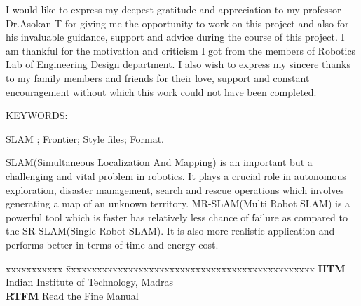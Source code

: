 \documentclass[MTech]{iitmdiss}
\begin{document}
\acknowledgements

I would like to express my deepest gratitude and appreciation to my professor Dr.Asokan T for giving me the opportunity to work on this project and also for his invaluable guidance, support and advice during the course of this project. I am thankful for the motivation and criticism I got from the members of Robotics Lab of Engineering Design department. I also wish to express my sincere thanks to my family members and friends for their love, support and constant encouragement without which this work could not have been completed. 


\abstract

\noindent KEYWORDS: \hspace*{0.5em} \parbox[t]{4.4in}{SLAM ; Frontier;
  Style files; Format.}

\vspace*{24pt}

\noindent SLAM(Simultaneous Localization And Mapping) is an important but a challenging and vital problem in robotics. It plays a crucial role in autonomous exploration, disaster management, search and rescue operations which involves generating a map of an unknown territory. MR-SLAM(Multi Robot SLAM) is a powerful tool which is faster has relatively less chance of failure as compared to the SR-SLAM(Single Robot SLAM). It is also more realistic application and performs better in terms of time and energy cost. 
\pagebreak


\begin{singlespace}
\tableofcontents
\thispagestyle{empty}

\listoftables
{}
\listoffigures
{}
\end{singlespace}


\abbreviations

\noindent 
\begin{tabbing}
xxxxxxxxxxx \= xxxxxxxxxxxxxxxxxxxxxxxxxxxxxxxxxxxxxxxxxxxxxxxx \kill
\textbf{IITM}   \> Indian Institute of Technology, Madras \\
\textbf{RTFM} \> Read the Fine Manual \\
\end{tabbing}
\end{document}
